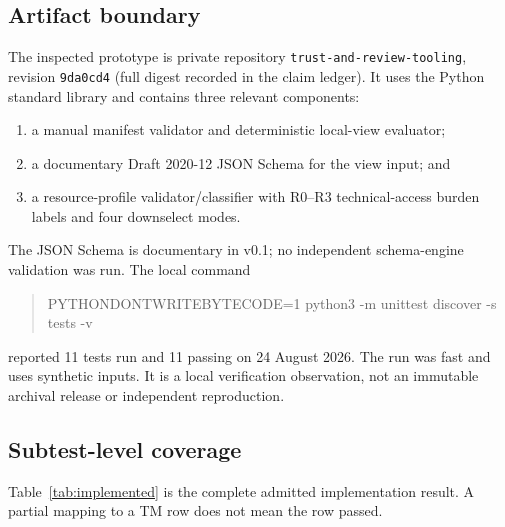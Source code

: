 \documentclass[11pt]{article}
\begin{document}
\subsection{Artifact boundary}

The inspected prototype is private repository \texttt{trust-and-review-tooling},
revision \texttt{9da0cd4} (full digest recorded in the claim ledger). It uses the Python
standard library and contains three relevant components:

\begin{enumerate}
  \item a manual manifest validator and deterministic local-view evaluator;
  \item a documentary Draft 2020-12 JSON Schema for the view input; and
  \item a resource-profile validator/classifier with R0--R3 technical-access
  burden labels and four downselect modes.
\end{enumerate}

The JSON Schema is documentary in v0.1; no independent schema-engine validation
was run. The local command
\begin{quote}\ttfamily\small
PYTHONDONTWRITEBYTECODE=1 python3 -m unittest discover -s tests -v
\end{quote}
reported 11 tests run and 11 passing on 24 August 2026. The run was fast and uses
synthetic inputs. It is a local verification observation, not an immutable archival
release or independent reproduction.

\subsection{Subtest-level coverage}

Table~\ref{tab:implemented} is the complete admitted implementation result. A
partial mapping to a TM row does not mean the row passed.
\end{document}

